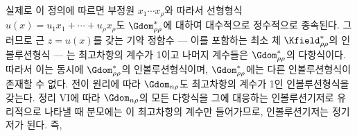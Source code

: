 
실제로 이 정의에 따르면 부정원 $x_1\cdots x_\rho$와 따라서 선형형식 $u(x)=u_1x_1+\cdots+u_\rho x_\rho$도 $\Gdom^*_{\rho\rho}$에 대하여 대수적으로 정수적으로 종속된다. 그러므로 근 $z=u(x)$를 갖는 기약 정함수 --- 이를 포함하는 최소 체 $\Kfield^*_{\rho\rho}$의 인볼루션형식 --- 는 최고차항의 계수가 1이고 나머지 계수들은 $\Gdom^*_{\rho\rho}$의 다항식이다. 따라서 이는 동시에 $\Gdom^*_{\rho\rho}$의 인볼루션형식이며, $\Gdom^*_{\rho\rho}$에는 다른 인볼루션형식이 존재할 수 없다. 전이 원리에 따라 $\Gdom_{n\rho}$도 최고차항의 계수가 1인 인볼루션형식을 갖는다. 정리 VI에 따라 $\Gdom_{n\rho}$의 모든 다항식을 그에 대응하는 인볼루션기저로 유리적으로 나타낼 때 분모에는 이 최고차항의 계수만 들어가므로, 인볼루션기저는 정기저가 된다. 즉,
